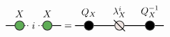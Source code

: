 
\renewcommand{\graphTensorSpacing}{1.1}
\renewcommand{\graphTensorTwoStart}{2.25*\graphTensorSpacing}
\[
\begin{tikzpicture}[baseline=-0.65ex]
	\node[circle,draw=black!80,thick,fill=myGreen,label=above:$X$] (X) at (0,0) {};
	\node (i) at (\graphLineSpacing,0) {$i$};
	\node[circle,draw=black!80,thick,fill=myGreen,label=above:$X$] (X1) at (2*\graphLineSpacing,0) {};

	\draw[thick, draw=black] (-\graphLineSpacing,0) -- (X) {};
	\draw[thick, dotted] (X) -- (i) -- (X1) {};
	\draw[thick, draw=black]  (X1) -- (3*\graphLineSpacing,0){};
\end{tikzpicture}
=
\begin{tikzpicture}[baseline=-0.65ex]
	\node[circle,draw=black!80,thick,fill=black,label=above:$Q_X$] (Q) at (0,0) {};
	
	\node[circle,draw=black!80,thick,fill=myGrey,label=above:$\lambda_X^i$] (LAMBDA) at (\graphTensorSpacing,0) {};
	\draw[thick] (\graphTensorSpacing - 0.2,0 + 0.2) -- (\graphTensorSpacing + 0.2,0 - 0.2) {};

	\node[circle,draw=black!80,thick,fill=black,label=above:$Q_X^{-1}$] (Q1) at (2*\graphTensorSpacing,0) {};

	\draw[thick, draw=black] (-\graphLineSpacing,0) -- (Q) -- (LAMBDA) -- (Q1) -- (2*\graphTensorSpacing + \graphLineSpacing,0) {};

\end{tikzpicture}
\]